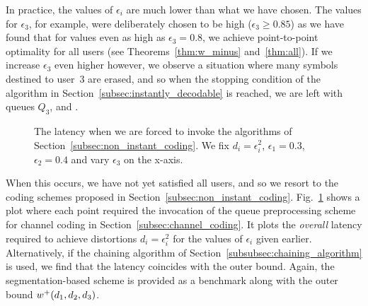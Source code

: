 In practice, the values of $\epsilon_i$ are much lower than what we have chosen.  The values for $\epsilon_3$, for example, were deliberately chosen to be high ($\epsilon_3 \geq 0.85$) as we have found that for values even as high as $\epsilon_3 = 0.8$, we achieve point-to-point optimality for all users (see Theorems~\ref{thm:w_minus} and~\ref{thm:all}).  If we increase $\epsilon_3$ even higher however, we observe a situation where many symbols destined to user~3 are erased, and so when the stopping condition of the algorithm in Section~\ref{subsec:instantly_decodable} is reached, we are left with queues $Q_3$,  and .
%
\begin{figure}
	\centering
	\setlength\figurewidth{2.65in} 
	\setlength\figureheight{2.07in} 
	
	\caption{The latency when we are forced to invoke the algorithms of Section~\ref{subsec:non_instant_coding}.  We fix $d_i = \epsilon_{i}^{2}$, $\epsilon_1 = 0.3$, $\epsilon_2 = 0.4$ and vary $\epsilon_3$ on the x-axis.  }
	\label{fig:t_total}
\end{figure}
%
When this occurs, we have not yet satisfied all users, and so we resort to the coding schemes proposed in Section~\ref{subsec:non_instant_coding}.  Fig.~\ref{fig:t_total} shows a plot where each point required the invocation of the queue preprocessing scheme for channel coding in Section~\ref{subsec:channel_coding}.  It plots the \emph{overall} latency required to achieve distortions $d_i = \epsilon_i^{2}$ for the values of $\epsilon_i$ given earlier.  Alternatively, if the chaining algorithm of Section~\ref{subsubsec:chaining_algorithm} is used, we find that the latency coincides with the outer bound.  Again, the segmentation-based scheme is provided as a benchmark along with the outer bound $w^{+}(d_1, d_2, d_3)$.

